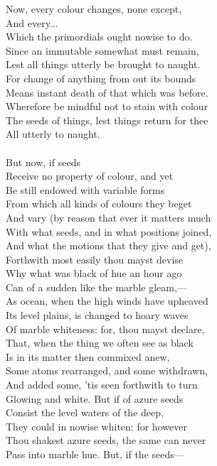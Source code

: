 Now, every colour changes, none except,\\
And every...\\
Which the primordials ought nowise to do.\\
Since an immutable somewhat must remain,\\
Lest all things utterly be brought to naught.\\
For change of anything from out its bounds\\
Means instant death of that which was before.\\
Wherefore be mindful not to stain with colour\\
The seeds of things, lest things return for thee\\
All utterly to naught.\\
\\
But now, if seeds\\
Receive no property of colour, and yet\\
Be still endowed with variable forms\\
From which all kinds of colours they beget\\
And vary (by reason that ever it matters much\\
With what seeds, and in what positions joined,\\
And what the motions that they give and get),\\
Forthwith most easily thou mayst devise\\
Why what was black of hue an hour ago\\
Can of a sudden like the marble gleam,—\\
As ocean, when the high winds have upheaved\\
Its level plains, is changed to hoary waves\\
Of marble whiteness: for, thou mayst declare,\\
That, when the thing we often see as black\\
Is in its matter then commixed anew,\\
Some atoms rearranged, and some withdrawn,\\
And added some, 'tis seen forthwith to turn\\
Glowing and white. But if of azure seeds\\
Consist the level waters of the deep,\\
They could in nowise whiten: for however\\
Thou shakest azure seeds, the same can never\\
Pass into marble hue. But, if the seeds—\\
